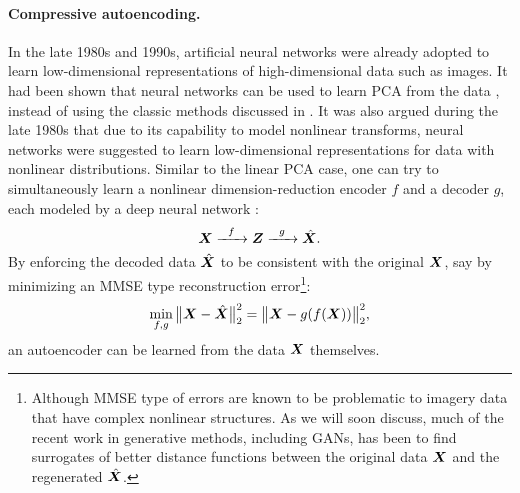 \documentclass[../../book-main.tex]{subfiles}
\begin{document}
\paragraph{Compressive autoencoding.}
In the late 1980s and 1990s, artificial neural networks were already adopted to learn low-dimensional representations of high-dimensional data such as images. It had been shown that neural networks can be used to learn PCA from the data \cite{Oja1982SimplifiedNM,Baldi89}, instead of using the classic methods discussed in . It was also argued during the late 1980s that due to its capability to model nonlinear transforms, neural networks were suggested to learn low-dimensional representations for data with nonlinear distributions. Similar to the linear PCA case, one can try to simultaneously learn a nonlinear dimension-reduction encoder $f$ and a decoder $g$, each modeled by a deep neural network  \cite{Rumelhart1986,Kramer1991NonlinearPC}:
\begin{equation}
    \bm{X}   \xrightarrow{\hspace{2mm} f \hspace{2mm}} \bm{Z}  \xrightarrow{\hspace{2mm} g \hspace{2mm}} \hat {\bm{X}}.
       \label{eqn:auto-encoding-deep-networks}
\end{equation}
By enforcing the decoded data $\hat {\bm{X}}$ to be consistent with the original $\bm{X}$, say by minimizing an MMSE type reconstruction error\footnote{Although MMSE type of errors are known to be problematic to imagery data that have complex nonlinear structures. As we will soon discuss, much of the recent work in generative methods, including GANs, has been to find surrogates of better distance functions between the original data $\bm{X}$ and the regenerated $\hat {\bm{X}}$.}:
\begin{equation}
    \min_{f,g} \big\|\bm{X} - \hat {\bm{X}}\big\|_2^2 = \big\|\bm{X} - g(f( \bm{X}))\big\|_2^2,
\end{equation}
an autoencoder can be learned from the data $\bm{X}$ themselves. 
\end{document}
